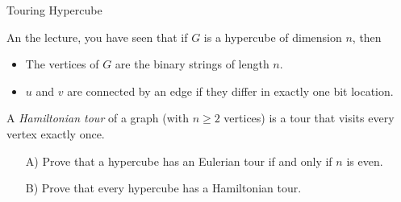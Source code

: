 \begin{homeworkProblem}{Touring Hypercube}

    An the lecture, you have seen that if $G$ is a hypercube of dimension $n$, then
    \begin{itemize}
        \item The vertices of $G$ are the binary strings of length $n$.
        \item $u$ and $v$ are connected by an edge if they differ in exactly one bit location.
    \end{itemize}
    
    A \emph{Hamiltonian tour} of a graph (with $n \geq 2$ vertices) is a tour that visits every vertex exactly once.

    \begin{itemize}
        \item[A)] Prove that a hypercube has an Eulerian tour if and only if $n$ is even.
        \item[B)] Prove that every hypercube has a Hamiltonian tour. 
    \end{itemize}
    
\end{homeworkProblem}